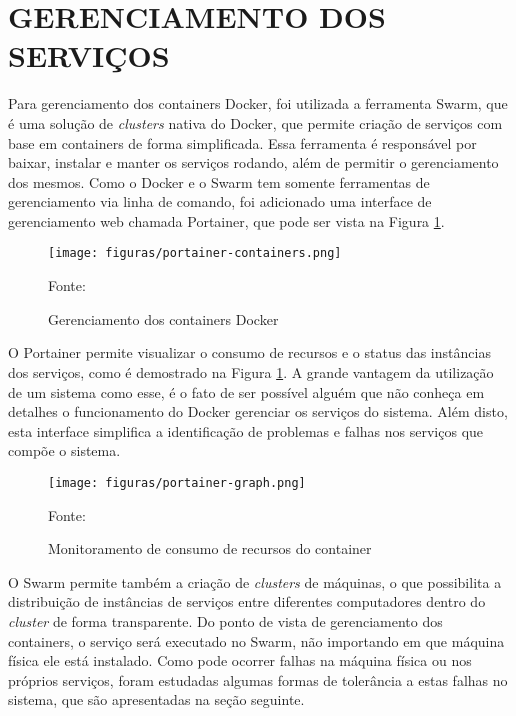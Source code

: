 \section{GERENCIAMENTO DOS SERVIÇOS}

Para gerenciamento dos containers Docker, foi utilizada a ferramenta Swarm,
que é uma solução de \emph{clusters} nativa do Docker, que permite criação de
serviços com base em containers de forma simplificada. Essa ferramenta é
responsável por baixar, instalar e manter os serviços rodando, além de
permitir o gerenciamento dos mesmos. Como o Docker e o Swarm tem somente
ferramentas de gerenciamento via linha de comando, foi adicionado uma
interface de gerenciamento web chamada Portainer, que pode ser vista na Figura
\ref{fig:portainer-containers}.

\begin{figure}[H]
	\centering
    \caption{Gerenciamento dos containers Docker}
	\texttt{[image: figuras/portainer-containers.png]}

	\label{fig:portainer-containers}
	\footnotesize Fonte: \fonteOAutor
\end{figure}

O Portainer permite visualizar o consumo de recursos e o status das instâncias
dos serviços, como é demostrado na Figura \ref{fig:portainer-containers}.
A grande vantagem da utilização de um sistema como esse, é o fato de ser
possível alguém que não conheça em detalhes o funcionamento do Docker gerenciar
os serviços do sistema. Além disto, esta interface simplifica a identificação
de problemas e falhas nos serviços que compõe o sistema.

\begin{figure}[H]
	\centering
    \caption{Monitoramento de consumo de recursos do container}
	\texttt{[image: figuras/portainer-graph.png]}

	\label{fig:portainer-graph}
	\footnotesize Fonte: \fonteOAutor
\end{figure}

O Swarm permite também a criação de \emph{clusters} de máquinas, o que
possibilita a distribuição de instâncias de serviços entre diferentes
computadores dentro do \emph{cluster} de forma transparente. Do ponto de
vista de gerenciamento dos containers, o serviço será executado no
Swarm, não importando em que máquina física ele está instalado. Como pode
ocorrer falhas na máquina física ou nos próprios serviços, foram estudadas
algumas formas de tolerância a estas falhas no sistema, que são apresentadas
na seção seguinte.

